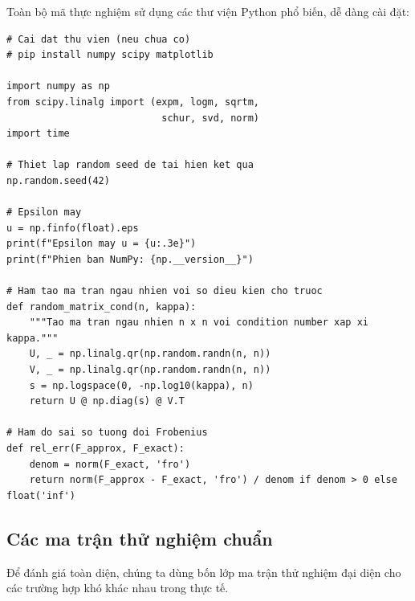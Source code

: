 \documentclass[12pt,a4paper]{report}
\begin{document}
Toàn bộ mã thực nghiệm sử dụng các thư viện Python phổ biến, dễ dàng cài đặt:

\begin{lstlisting}[style=python, caption={Thiết lập môi trường thực nghiệm}]
# Cai dat thu vien (neu chua co)
# pip install numpy scipy matplotlib

import numpy as np
from scipy.linalg import (expm, logm, sqrtm,
                           schur, svd, norm)
import time

# Thiet lap random seed de tai hien ket qua
np.random.seed(42)

# Epsilon may
u = np.finfo(float).eps
print(f"Epsilon may u = {u:.3e}")
print(f"Phien ban NumPy: {np.__version__}")

# Ham tao ma tran ngau nhien voi so dieu kien cho truoc
def random_matrix_cond(n, kappa):
    """Tao ma tran ngau nhien n x n voi condition number xap xi kappa."""
    U, _ = np.linalg.qr(np.random.randn(n, n))
    V, _ = np.linalg.qr(np.random.randn(n, n))
    s = np.logspace(0, -np.log10(kappa), n)
    return U @ np.diag(s) @ V.T

# Ham do sai so tuong doi Frobenius
def rel_err(F_approx, F_exact):
    denom = norm(F_exact, 'fro')
    return norm(F_approx - F_exact, 'fro') / denom if denom > 0 else float('inf')
\end{lstlisting}

\subsection{Các ma trận thử nghiệm chuẩn}

Để đánh giá toàn diện, chúng ta dùng bốn lớp ma trận thử nghiệm đại diện cho
các trường hợp khó khác nhau trong thực tế.
\end{document}

